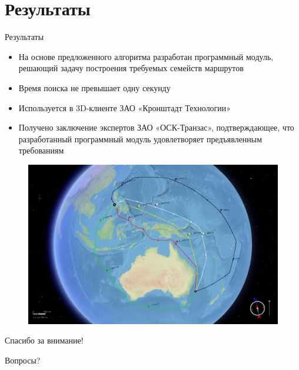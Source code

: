 \documentclass[russian, hyperref={unicode}]{beamer}
\begin{document}
\section{Результаты}

\begin{frame}{Результаты}
     {
        \begin{itemize}
            \item На основе предложенного алгоритма разработан программный модуль,
              решающий задачу построения требуемых семейств маршрутов
            \item Время поиска не превышает одну секунду
            \item Используется в 3D-клиенте ЗАО «Кронштадт Технологии»
            \item Получено заключение экспертов ЗАО «ОСК-Транзас», подтверждающее,
              что разработанный программный модуль удовлетворяет предъявленным
              требованиям
        \end{itemize}
    }
     {
        \begin{figure}
            \includegraphics[width=.9\textwidth]{Results/1}
        \end{figure}
    }
\end{frame}

\begin{frame}{Спасибо за внимание!}
    \begin{center}
        \Huge
        {\color{blue} Вопросы?}
    \end{center}
\end{frame}

\appendix

\newcommand{\metricspicture}[1] {
    \texttt{[image: Solution/metrics/\#1]}
}
\end{document}
